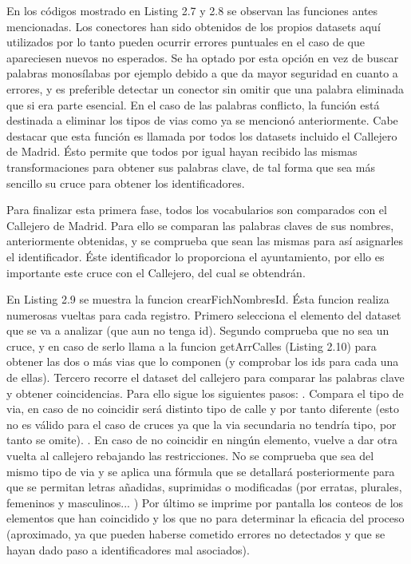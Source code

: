       En los códigos mostrado en Listing 2.7 y 2.8 se observan las funciones antes mencionadas. Los conectores han sido obtenidos de los propios datasets aquí utilizados por lo tanto pueden ocurrir errores puntuales en el caso de que apareciesen nuevos no esperados. Se ha optado por esta opción en vez de buscar palabras monosílabas por ejemplo debido a que da mayor seguridad en cuanto a errores, y es preferible detectar un conector sin omitir que una palabra eliminada que si era parte esencial.
      \newline
      En el caso de las palabras conflicto, la función está destinada a eliminar los tipos de vias como ya se mencionó anteriormente.
       \newline
       \newline
       Cabe destacar que esta función es llamada por todos los datasets incluido el Callejero de Madrid. Ésto permite que todos por igual hayan recibido las mismas transformaciones para obtener sus palabras clave, de tal forma que sea más sencillo su cruce para obtener los identificadores.
\newline

	    \item Para finalizar esta primera fase, todos los vocabularios son comparados con el Callejero de Madrid. Para ello se comparan las palabras claves de sus nombres, anteriormente obtenidas, y se comprueba que sean las mismas para así asignarles el identificador. Éste identificador lo proporciona el ayuntamiento, por ello es importante este cruce con el Callejero, del cual se obtendrán.
	    
	     
    
En Listing 2.9 se muestra la funcion crearFichNombresId. Ésta funcion realiza numerosas vueltas para cada registro. Primero selecciona el elemento del dataset que se va a analizar (que aun no tenga id). Segundo comprueba que no sea un cruce, y en caso de serlo llama a la funcion getArrCalles (Listing 2.10) para obtener las dos o más vias que lo componen (y comprobar los ids para cada una de ellas). Tercero recorre el dataset del callejero para comparar las palabras clave y obtener coincidencias. Para ello sigue los siguientes pasos:
. Compara el tipo de via, en caso de no coincidir será distinto tipo de calle y por tanto diferente (esto no es válido para el caso de cruces ya que la via secundaria no tendría tipo, por tanto se omite).
. En caso de no coincidir en ningún elemento, vuelve a dar otra vuelta al callejero rebajando las restricciones. No se comprueba que sea del mismo tipo de via y se aplica una fórmula que se detallará posteriormente para que se permitan letras añadidas, suprimidas o modificadas (por erratas, plurales, femeninos y masculinos... )
\newline
Por último se imprime por pantalla los conteos de los elementos que han coincidido y los que no para determinar la eficacia del proceso (aproximado, ya que pueden haberse cometido errores no detectados y que se hayan dado paso a identificadores mal asociados).
\newline

